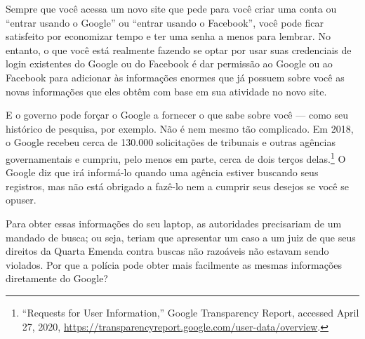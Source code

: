 \begin{tcolorbox}
    Sempre que você acessa um novo site que pede para você criar uma conta ou ``entrar usando
    o Google'' ou ``entrar usando o Facebook'', você pode ficar satisfeito por economizar tempo
    e ter uma senha a menos para lembrar. No entanto, o que você está realmente fazendo se
    optar por usar suas credenciais de login existentes do Google ou do Facebook é dar permissão
    ao Google ou ao Facebook para adicionar às informações enormes que já possuem sobre você as
    novas informações que eles obtêm com base em sua atividade no novo site.
\end{tcolorbox}

E o governo pode forçar o Google a fornecer o que sabe sobre você --- como seu histórico de
pesquisa, por exemplo. Não é nem mesmo tão complicado. Em 2018, o Google recebeu cerca de 130.000
solicitações de tribunais e outras agências governamentais e cumpriu, pelo menos em parte, cerca
de dois terços delas.\footnote{``Requests for User Information,'' Google Transparency Report,
accessed April 27, 2020, \url{https://transparencyreport.google.com/user-data/overview}.} O Google
diz que irá informá-lo quando uma agência estiver buscando seus registros, mas não está obrigado
a fazê-lo nem a cumprir seus desejos se você se opuser.

Para obter essas informações do seu laptop, as autoridades precisariam de um mandado de busca; ou
seja, teriam que apresentar um caso a um juiz de que seus direitos da Quarta Emenda contra buscas
não razoáveis não estavam sendo violados. Por que a polícia pode obter mais facilmente as mesmas
informações diretamente do Google?

